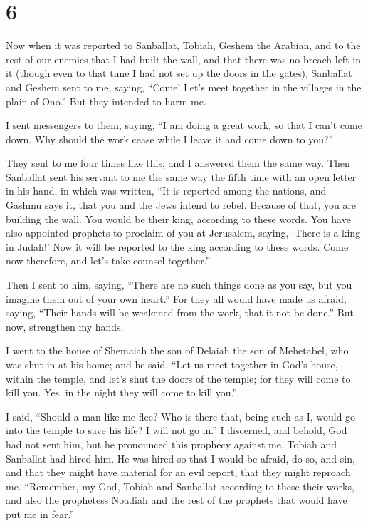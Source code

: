 \hypertarget{section-5}{%
\section{6}\label{section-5}}

 Now when it was reported to Sanballat, Tobiah, Geshem the
Arabian, and to the rest of our enemies that I had built the wall, and
that there was no breach left in it (though even to that time I had not
set up the doors in the gates),  Sanballat and Geshem sent
to me, saying, ``Come! Let's meet together in the villages in the plain
of Ono.'' But they intended to harm me.

 I sent messengers to them, saying, ``I am doing a great
work, so that I can't come down. Why should the work cease while I leave
it and come down to you?''

 They sent to me four times like this; and I answered them
the same way.  Then Sanballat sent his servant to me the
same way the fifth time with an open letter in his hand,  in
which was written, ``It is reported among the nations, and Gashmu says
it, that you and the Jews intend to rebel. Because of that, you are
building the wall. You would be their king, according to these words.
 You have also appointed prophets to proclaim of you at
Jerusalem, saying, `There is a king in Judah!' Now it will be reported
to the king according to these words. Come now therefore, and let's take
counsel together.''

 Then I sent to him, saying, ``There are no such things done
as you say, but you imagine them out of your own heart.'' 
For they all would have made us afraid, saying, ``Their hands will be
weakened from the work, that it not be done.'' But now, strengthen my
hands.

 I went to the house of Shemaiah the son of Delaiah the son
of Mehetabel, who was shut in at his home; and he said, ``Let us meet
together in God's house, within the temple, and let's shut the doors of
the temple; for they will come to kill you. Yes, in the night they will
come to kill you.''

 I said, ``Should a man like me flee? Who is there that,
being such as I, would go into the temple to save his life? I will not
go in.''  I discerned, and behold, God had not sent him,
but he pronounced this prophecy against me. Tobiah and Sanballat had
hired him.  He was hired so that I would be afraid, do so,
and sin, and that they might have material for an evil report, that they
might reproach me.  ``Remember, my God, Tobiah and
Sanballat according to these their works, and also the prophetess
Noadiah and the rest of the prophets that would have put me in fear.''

